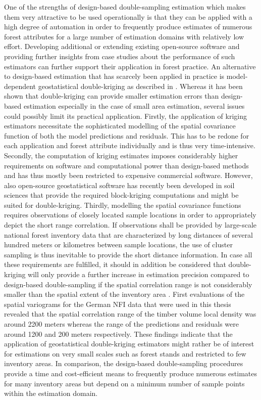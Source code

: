 One of the strengths of design-based double-sampling estimation which makes them very attractive to be used operationally is that they can be applied with a high degree of automation in order to frequently produce estimates of numerous forest attributes for a large number of estimation domains with relatively low effort. Developing additional or extending existing open-source software and providing further insights from case studies about the performance of such estimators can further support their application in forest practice. An alternative to design-based estimation that has scarcely been applied in practice is model-dependent geostatistical double-kriging as described in \citet{mandallaz1993}. Whereas it has been shown that double-kriging can provide smaller estimation errors than design-based estimation especially in the case of small area estimation, several issues could possibly limit its practical application. Firstly, the application of kriging estimators necessitate the sophisticated modelling of the spatial covariance function of both the model predictions and residuals. This has to be redone for each application and forest attribute individually and is thus very time-intensive. Secondly, the computation of kriging estimates imposes considerably higher requirements on software and computational power than design-based methods and has thus mostly been restricted to expensive commercial software. However, also open-source geostatistical software has recently been developed in soil sciences \citep{georob2018} that provide the required block-kriging computations and might be suited for double-kriging. Thirdly, modelling the spatial covariance functions requires observations of closely located sample locations in order to appropriately depict the short range correlation. If observations shall be provided by large-scale national forest inventory data that are characterized by long distances of several hundred meters or kilometres between sample locations, the use of cluster sampling is thus inevitable to provide the short distance information. In case all these requirements are fulfilled, it should in addition be considered that double-kriging will only provide a further increase in estimation precision compared to design-based double-sampling if the spatial correlation range is not considerably smaller than the spatial extent of the inventory area \citep{mandallaz1993}. First evaluations of the spatial variograms for the German NFI data that were used in this thesis revealed that the spatial correlation range of the timber volume local density was around 2200 meters whereas the range of the predictions and residuals were around 1200 and 200 meters respectively. These findings indicate that the application of geostatistical double-kriging estimators might rather be of interest for estimations on very small scales such as forest stands and restricted to few inventory areas. In comparison, the design-based double-sampling procedures provide a time and cost-efficient means to frequently produce numerous estimates for many inventory areas but depend on a minimum number of sample points within the estimation domain.



